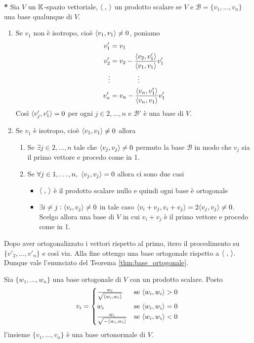 \begin{thm} \textbf{*}
	Sia $ V $ un $ \mathbb{K} $-spazio vettoriale, $ \langle \;, \, \rangle $ un prodotto scalare se $ V $ e $ \mathscr{B} = \{v_1, \ldots, v_n\} $ una base qualunque di $ V $. 
	\begin{enumerate}
		\item Se $ v_1 $ non è isotropo, cioè $ \langle v_1, v_1 \rangle \neq 0 $, poniamo
		\begin{align*}
		v'_1 & = v_1 \\
		v'_2 & = v_2 - \frac{\langle v_2, v'_1 \rangle}{\langle v_1, v_1 \rangle} v'_1 \\
		\vdots & \qquad \qquad  \vdots \\
		v'_n & = v_n - \frac{\langle v_n, v'_1 \rangle}{\langle v_n, v_1 \rangle} v'_1
		\end{align*}
		Così $ \langle v'_j, v'_1 \rangle = 0 $ per ogni $ j \in {2, \ldots, n} $ e $ \mathscr{B}' $ è una base di $ V $.
		\item Se $ v_1 $ è isotropo, cioè $ \langle v_1, v_1 \rangle \neq 0 $ allora 
		\begin{enumerate}
			\item Se $ \exists j \in {2, \ldots, n} $ tale che $ \langle v_j, v_j \rangle \neq 0 $ permuto la base $ \mathscr{B} $ in modo che $ v_j $ sia il primo vettore e procedo come in 1.
			\item Se $ \forall j \in {1, \ldots, n}, \ \scprd{v_j}{v_j} = 0 $ allora ci sono due casi
			\begin{itemize}
				\item $  \langle \;, \, \rangle $ è il prodotto scalare nullo e quindi ogni base è ortogonale
				\item $ \exists i \neq j :  \langle v_i, v_j \rangle \neq 0 $ in tale caso $ \langle v_i + v_j, v_i + v_j \rangle = 2 \langle v_j, v_j \rangle \neq 0 $. Scelgo allora una base di $ V $ in cui $ v_i + v_j $ è il primo vettore e procedo come in 1.
			\end{itemize}
		\end{enumerate}
	\end{enumerate}
	Dopo aver ortogonalizzato i vettori rispetto al primo, itero il procedimento su $ \{v'_2, \ldots, v'_n\} $ e così via. Alla fine ottengo una base ortogonale rispetto a $ \langle \;, \, \rangle $. Dunque vale l'enunciato del Teorema \ref{thm:base_ortogonale}.
\end{thm}

\begin{prop}
	Sia $ \{w_1, \ldots, w_n\} $ una base ortogonale di $ V $ con un prodotto scalare. Posto
	\[v_i = 
	\begin{cases*}
	\frac{w_i}{\sqrt{\scprd{w_i}{w_i}}} & se $ \scprd{w_i}{w_i} > 0 $ \\
	w_i & se $ \scprd{w_i}{w_i} = 0 $ \\
	\frac{w_i}{\sqrt{-\scprd{w_i}{w_i}}} & se $ \scprd{w_i}{w_i} < 0 $ \\
	\end{cases*}\]
	l'insieme $ \{v_1, \ldots, v_n\} $ è una base ortonormale di $ V $. 
\end{prop}

